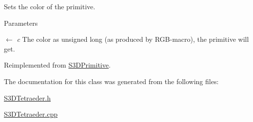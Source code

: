 Sets the color of the primitive. 


\begin{DoxyParams}{Parameters}
\item[\mbox{$\leftarrow$} {\em c}]The color as unsigned long (as produced by RGB-\/macro), the primitive will get. \end{DoxyParams}


Reimplemented from \hyperlink{class_s3_d_primitive_a1c8f036193987522bdfb6a49b9b74000}{S3DPrimitive}.



The documentation for this class was generated from the following files:\begin{DoxyCompactItemize}
\item 
\hyperlink{_s3_d_tetraeder_8h}{S3DTetraeder.h}\item 
\hyperlink{_s3_d_tetraeder_8cpp}{S3DTetraeder.cpp}\end{DoxyCompactItemize}

